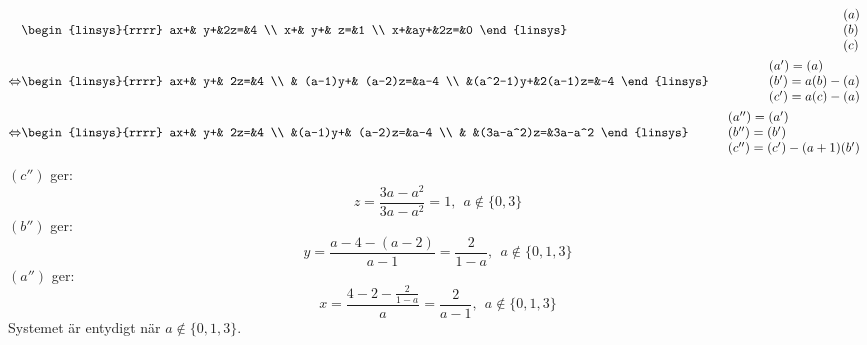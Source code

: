 \begin{task}{1.18}
	\begin{align*}
		&\begin{linsys}{rrrr}
			ax+& y+&2z=&4 \\
			 x+& y+& z=&1 \\
			 x+&ay+&2z=&0
		\end{linsys}
		&\begin{array}{l} 
			(a) \\ 
			(b) \\
			(c)
		\end{array} \\ \lra
		&\begin{linsys}{rrrr}
			ax+&       y+&     2z=&4 \\
			   &  (a-1)y+& (a-2)z=&a-4 \\
			   &(a^2-1)y+&2(a-1)z=&-4
		\end{linsys}
		&\begin{array}{l} 
			(a')=(a) \\ 
			(b')=a(b)-(a) \\
			(c')=a(c)-(a)
		\end{array} \\ \lra
		&\begin{linsys}{rrrr}
			ax+&     y+&       2z=&4 \\
			   &(a-1)y+&   (a-2)z=&a-4 \\
			   &       &(3a-a^2)z=&3a-a^2
		\end{linsys}
		&\begin{array}{l} 
			(a'')=(a') \\ 
			(b'')=(b') \\
			(c'')=(c')-(a+1)(b')
		\end{array} 
	\end{align*}
	$(c'')$ ger:
	\[z=\frac{3a-a^2}{3a-a^2}=1,~~a\not\in\{0,3\}\]
	$(b'')$ ger:
	\[y=\frac{a-4-(a-2)}{a-1}=\frac{2}{1-a},~~a\not\in\{0,1,3\}\]
	$(a'')$ ger:
	\[x=\frac{4-2-\frac{2}{1-a}}{a}=\frac{2}{a-1},~~a\not\in\{0,1,3\}\]
	Systemet är entydigt när $a\not\in\{0,1,3\}$.


\end{task}
